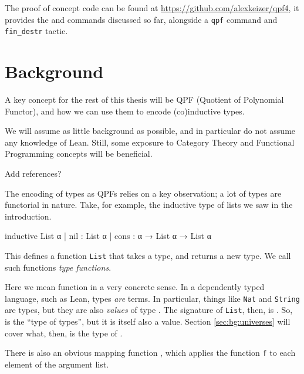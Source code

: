 \documentclass[titlepage]{report}
\newenvironment{remark}[1][Remark:]{\begin{trivlist}                         
    \item[\hskip \labelsep {\bfseries #1}]}{\end{trivlist}}
\newenvironment{todo}[1][Todo:]{\begin{trivlist}                         
    \item[\hskip \labelsep {\bfseries #1}]}{\end{trivlist}}
\newcommand\data{\lean{data}}
\newcommand\codata{\lean{codata}}
\newcommand\Type{\lean{Type}}
\begin{document}
The proof of concept code can be found at \url{https://github.com/alexkeizer/qpf4}, it provides the \data and \codata commands discussed so far, alongside a \texttt{qpf} command and \texttt{fin\_destr} tactic.











\chapter{Background}
\label{ch:background}

A key concept for the rest of this thesis will be QPF (Quotient of Polynomial Functor), and how we can use them to encode (co)inductive types.

We will assume as little background as possible, and in particular do not assume any knowledge of Lean. Still, some exposure to Category Theory and Functional Programming concepts will be beneficial.
\begin{todo}
    Add references?
\end{todo}


The encoding of types as QPFs relies on a key observation; a lot of types are functorial in nature.
Take, for example, the inductive type of lists we saw in the introduction.
\begin{leancode}
    inductive List α 
    | nil  : List α
    | cons : α → List α → List α
\end{leancode}

This defines a function \texttt{List} that takes a type, and returns a new type.
We call such functions \emph{type functions}.

\begin{remark}
    Here we mean function in a very concrete sense. In a dependently typed language, such as Lean, types \emph{are} terms. In particular, things like \texttt{Nat} and \texttt{String} are types, but they are also \emph{values} of type \Type.
    The signature of \texttt{List}, then, is .
    So, \Type is the ``type of types'', but it is itself also a value.
    Section \ref{sec:bg:universes} will cover what, then, is the type of \Type.
\end{remark}

There is also an obvious mapping function , 
which applies the function \texttt{f} to each element of the argument list.
\end{document}
